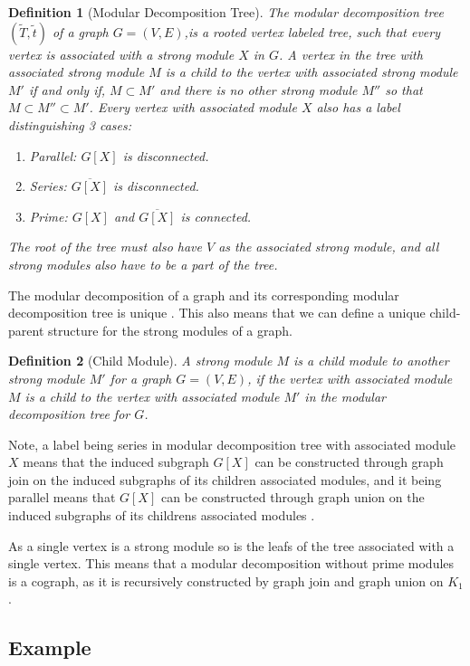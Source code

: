 \documentclass[a4paper]{article}
\newtheorem{definition}{Definition}[section]
\newcommand{\T}{\widetilde{T}}
\renewcommand{\t}{\widetilde{t}}
\begin{document}
\begin{definition}[Modular Decomposition Tree]{\cite{MDTree}}
    The modular decomposition tree $(\T,\t)$ of a graph $G = (V,E)$,is a rooted
    vertex labeled tree, such that every vertex is associated with a strong
    module $X$ in $G$.  A vertex in the tree with associated strong module $M$
    is a child to the vertex with associated strong module $M'$ if and only if,
    $M \subset M'$ and there is no other strong module $M''$ so that $M \subset
    M'' \subset M'$. Every vertex with associated module $X$ also has a label
    distinguishing 3 cases:
    \begin{enumerate}
        \item Parallel: $G[X]$ is disconnected.
        \item Series: $\overline{G[X]}$ is disconnected.
        \item Prime: $G[X]$ and $\overline{G[X]}$ is connected.
    \end{enumerate}
    The root of the tree must also have $V$ as the associated strong module, and all 
    strong modules also have to be a part of the tree.
\end{definition}
The modular decomposition of a graph and its corresponding modular
decomposition tree is unique \cite{MDUnique}. This also means that we can 
define a unique child-parent structure for the strong modules of a graph.

\begin{definition}[Child Module]
    A strong module $M$ is a child module to another strong module $M'$ for a
    graph $G = (V,E)$, if the vertex with associated module $M$ is a child to
    the vertex with associated module $M'$ in the modular decomposition tree for
    $G$.
\end{definition}

Note, a label being series in modular decomposition tree with associated module
$X$ means that the induced subgraph $G[X]$ can be constructed through graph
join on the induced subgraphs of its children associated modules, and it being
parallel means that $G[X]$ can be constructed through graph union on the
induced subgraphs of its childrens associated modules \cite{HCL}.

As a single vertex is a strong module so is the leafs of the tree associated
with a single vertex. This means that a modular decomposition without
prime modules is a cograph, as it is recursively constructed by graph join and
graph union on $K_1$.


\subsection{Example}
\end{document}
